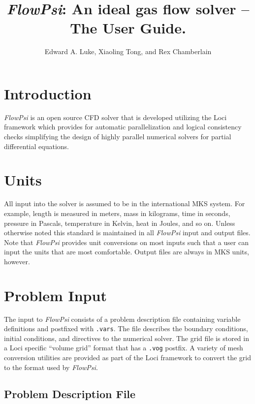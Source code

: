 \documentclass{article}
\begin{document}
\title{{\em FlowPsi}: An ideal gas flow solver -- The User Guide.}

\author{ Edward A. Luke, Xiaoling Tong, and Rex Chamberlain}

\maketitle
\tableofcontents
\clearpage

\section{Introduction}

{\em FlowPsi } is an open source CFD solver that is developed
utilizing the Loci framework\cite{Luke.2005,Zhang.2009} which provides
for automatic parallelization and logical consistency checks
simplifying the design of highly parallel numerical solvers for
partial differential equations.

\section{Units}

All input into the solver is assumed to be in the international MKS
system.  For example, length is measured in meters, mass in kilograms,
time in seconds, pressure in Pascals, temperature in Kelvin, heat in
Joules, and so on.  Unless otherwise noted this standard is maintained
in all {\em FlowPsi} input and output files.  Note that {\em FlowPsi}
provides unit conversions on most inputs such that a user can input
the units that are most comfortable.  Output files are always in MKS
units, however.

\section{Problem Input}

The input to {\em FlowPsi} consists of a problem description file containing
variable definitions and postfixed with {\tt .vars}. The file
describes the boundary conditions, initial conditions, and directives
to the numerical solver. The grid file is stored in a Loci specific
``volume grid'' format that has a {\tt .vog} postfix.  A variety of
mesh conversion utilities are provided as part of the Loci framework
to convert the grid to the format used by {\em FlowPsi}.  

\subsection{Problem Description File}
\label{prob_description_file}
\end{document}
